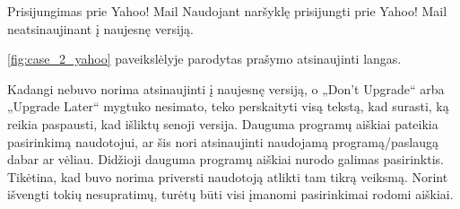 ﻿\begin{xcase}{Prisijungimas prie Yahoo! Mail}
  \xcgoal
  {
    Naudojant naršyklę prisijungti prie Yahoo! Mail neatsinaujinant į naujesnę versiją.
  }
  \xctools
  {
    \ref{fig:case_2_yahoo} paveikslėlyje parodytas prašymo atsinaujinti langas.

  }
  \xcresult
  {
    Kadangi nebuvo norima atsinaujinti į naujesnę versiją, o „Don't Upgrade“ arba „Upgrade Later“ 
    mygtuko nesimato, teko perskaityti visą tekstą, kad surasti, ką reikia paspausti, kad 
    išliktų senoji versija.
  }
  \xcprinciples
  {
    {
      Dauguma programų aiškiai pateikia pasirinkimą naudotojui, ar
      šis nori atsinaujinti naudojamą programą/paslaugą dabar ar
      vėliau.
    }
    {
      Didžioji dauguma programų aiškiai nurodo galimas pasirinktis.
    }
  }
  \xcthoughts
  {
    Tikėtina, kad buvo norima priversti naudotoją atlikti tam tikrą
    veiksmą. Norint išvengti tokių nesupratimų, turėtų būti visi
    įmanomi pasirinkimai rodomi aiškiai.
  }
\end{xcase}
